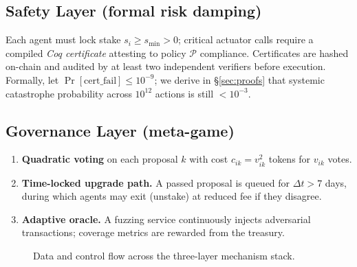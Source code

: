 \documentclass[11pt]{article}
\theoremstyle{plain}
\begin{document}
\subsection{Safety Layer (formal risk damping)}
Each agent must lock stake $s_i\!\ge\!s_{\min}>0$;  
critical actuator calls require a compiled \emph{Coq certificate}
attesting to policy $\mathcal{P}$ compliance.  
Certificates are hashed on-chain and audited by at least two
independent verifiers before execution.  
Formally, let 
$\Pr[\text{cert\_fail}]\le 10^{-9}$;  
we derive in \S\ref{sec:proofs} that systemic catastrophe probability
across $10^{12}$ actions is still $<10^{-3}$.

\subsection{Governance Layer (meta-game)}
\begin{enumerate}\itemsep2pt
\item \textbf{Quadratic voting} on each proposal $k$ with cost
$c_{ik}=v_{ik}^2$ tokens for $v_{ik}$ votes.  
\item \textbf{Time-locked upgrade path.}  
A passed proposal is queued for $\Delta t\!>\!7$ days, during which
agents may exit (unstake) at reduced fee if they disagree.
\item \textbf{Adaptive oracle.}  
A fuzzing service continuously injects adversarial transactions;
coverage metrics are rewarded from the treasury.
\end{enumerate}

\begin{figure}[h]
\centering
{}
\caption{Data and control flow across the three-layer mechanism stack.}
\label{fig:stack}
\end{figure}
\end{document}
